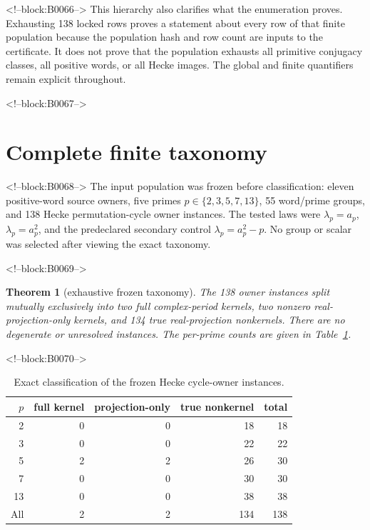 \documentclass[11pt]{article}
\newtheorem{theorem}{Theorem}[section]
\theoremstyle{definition}
\theoremstyle{remark}
\begin{document}
<!--block:B0066-->
This hierarchy also clarifies what the enumeration proves. Exhausting 138 locked rows proves a statement about every row of that finite population because the population hash and row count are inputs to the certificate. It does not prove that the population exhausts all primitive conjugacy classes, all positive words, or all Hecke images. The global and finite quantifiers remain explicit throughout.

<!--block:B0067-->
\section{Complete finite taxonomy}

<!--block:B0068-->
The input population was frozen before classification: eleven positive-word source owners, five primes $p\in\{2,3,5,7,13\}$, 55 word/prime groups, and 138 Hecke permutation-cycle owner instances. The tested laws were $\lambda_p=a_p$, $\lambda_p=a_p^2$, and the predeclared secondary control $\lambda_p=a_p^2-p$. No group or scalar was selected after viewing the exact taxonomy.

<!--block:B0069-->
\begin{theorem}[exhaustive frozen taxonomy]\label{thm:taxonomy}
The 138 owner instances split mutually exclusively into two full complex-period kernels, two nonzero real-projection-only kernels, and 134 true real-projection nonkernels. There are no degenerate or unresolved instances. The per-prime counts are given in Table~\ref{tab:instances}.
\end{theorem}

<!--block:B0070-->
\begin{table}[ht]
\centering
\caption{Exact classification of the frozen Hecke cycle-owner instances.}
\label{tab:instances}
\begin{tabular}{rrrrr}
\toprule
$p$ & full kernel & projection-only & true nonkernel & total\\
\midrule
2  & 0 & 0 & 18 & 18\\
3  & 0 & 0 & 22 & 22\\
5  & 2 & 2 & 26 & 30\\
7  & 0 & 0 & 30 & 30\\
13 & 0 & 0 & 38 & 38\\
\midrule
All & 2 & 2 & 134 & 138\\
\bottomrule
\end{tabular}
\end{table}
\end{document}
